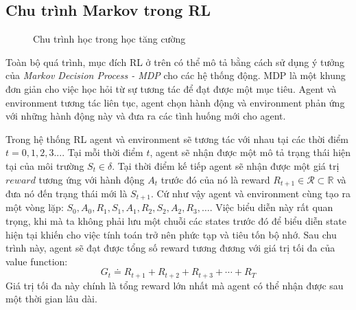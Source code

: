 \subsection{Chu trình Markov trong RL}
\begin{figure}[ht]
    \centering
    \caption{Chu trình học trong học tăng cường}
    \label{fig:problem:mdp}
\end{figure}
Toàn bộ quá trình, mục đích RL ở trên có thể mô tả bằng cách sử dụng ý tưởng của \emph{Markov Decision Process - MDP} cho các hệ thống động. MDP là một khung đơn giản cho việc học hỏi từ sự tương tác để đạt được một mục tiêu. Agent và environment tương tác liên tục, agent chọn hành động và environment phản ứng với những hành động này và đưa ra các tình huống mới cho agent. 

Trong hệ thống RL agent và environment sẽ tương tác với nhau tại các thời điểm $t=0,1,2,3...$. Tại mỗi thời điểm $t$, agent sẽ nhận được một mô tả trạng thái hiện tại của môi trường $S_t \in \delta$. Tại thời điểm kế tiếp agent sẽ nhận được một giá trị $reward$ tương ứng với hành động $A_{t}$ trước đó của nó là reward $R_{t+1} \in \mathcal{R} \subset \mathbb{R}$ và đưa nó đến trạng thái mới là $S_{t+1}$. Cứ như vậy agent và environment cùng tạo ra một vòng lặp: $S_{0}, A_{0}, R_{1}, S_{1}, A_{1}, R_{2}, S_{2}, A_{2}, R_{3}, \dots$. Việc biểu diễn này rất quan trọng, khi mà ta không phải lưu một chuỗi các states trước đó để biểu diễn state hiện tại khiến cho việc tính toán trở nên phức tạp và tiêu tốn bộ nhớ.
Sau chu trình này, agent sẽ đạt được tổng số reward tương đương với giá trị tối đa của value function:
\begin{equation}
    G_{t} \doteq R_{t+1}+R_{t+2}+R_{t+3}+\cdots+R_{T}
\end{equation}
Giá trị tối đa này chính là tổng reward lớn nhất mà agent có thể nhận được sau một thời gian lâu dài. 
